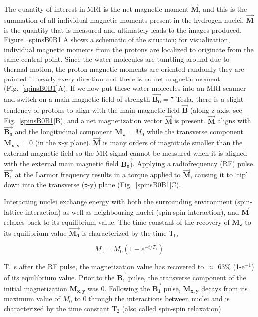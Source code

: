 The quantity of interest in MRI is the net magnetic moment  $\vec{\mathbf{M}}$, and this is the summation of all individual magnetic moments present in the hydrogen nuclei. 
$\vec{\mathbf{M}}$ is the quantity that is measured and ultimately leads to the images produced.
Figure~\ref{spinsB0B1}A shows a schematic of the situation; for visualization, individual magnetic moments from the protons are localized to originate from the same central point.
Since the water molecules are tumbling around due to thermal motion, the proton magnetic moments are oriented randomly they are pointed in nearly every direction and there is no net magnetic moment (Fig.~\ref{spinsB0B1}A).
If we now put these water molecules into an MRI scanner and switch on a main magnetic field of strength $\vec{\mathbf{B_0}} = 7$ Tesla, there is a slight tendency of protons to align with the main magnetic field $\vec{\mathbf{B}}$ (along z axis, see Fig.~\ref{spinsB0B1}B), and a net magnetization vector $\vec{\mathbf{M}}$ is present.
$\vec{\mathbf{M}}$ aligns with $\vec{\mathbf{B_0}}$ and the longitudinal component $\mathbf{M_z} = M_0$ while the transverse component $\mathbf{M_{x,y}} = 0$ (in the x-y plane).
$\vec{\mathbf{M}}$ is many orders of magnitude smaller than the external magnetic field so the MR signal cannot be measured when it is aligned with the external main magnetic field $\vec{\mathbf{B_0)}}$. 
Applying a radiofrequency (RF) pulse $\vec{\mathbf{B_1}}$ at the Larmor frequency results in a torque applied to $\vec{\mathbf{M}}$, causing it to `tip' down into the transverse (x-y) plane (Fig.~\ref{spinsB0B1}C).

Interacting nuclei exchange energy with both the surrounding environment (spin-lattice interaction) as well as neighbouring nuclei (spin-spin interaction), and $\vec{\mathbf{M}}$ relaxes back to its equilibrium value. 
The time constant of the recovery of $\mathbf{M_z}$ to its equilibrium value $\vec{\mathbf{M_0}}$ is characterized by the time T$_1$,

\begin{equation}
	M_z = M_0(1-e^{-t/T_1})
	\label{T1}
\end{equation}

T$_1$ s after the RF pulse, the magnetization value has recovered to $\approx$ 63\% (1-e$^{-1}$) of its equilibrium value.
Prior to the $\vec{\mathbf{B_1}}$ pulse, the transverse component of the initial magnetization $\mathbf{M_{x,y}}$ was 0.
Following the $\vec{\mathbf{B_1}}$ pulse, $\mathbf{M_{x,y}}$ decays from its maximum value of $M_0$ to 0 through the interactions between nuclei and is characterized by the time constant T$_2$ (also called spin-spin relaxation).
		

